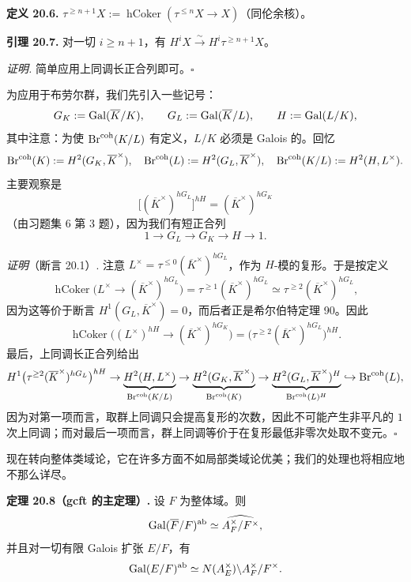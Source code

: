 \textbf{定义 20.6.} $\tau^{\geq n+1}X:=\operatorname{hCoker}(\tau^{\leq n}X\to X)$（同伦余核）。

\textbf{引理 20.7.} 对一切 $i\geq n+1$，有 $H^iX\xrightarrow{\sim}H^i\tau^{\geq n+1}X$。

\textit{证明.} 简单应用上同调长正合列即可。\hfill$\square$

为应用于布劳尔群，我们先引入一些记号：
\[
G_K:=\operatorname{Gal}(\overline K/K),\qquad G_L:=\operatorname{Gal}(\overline K/L),\qquad H:=\operatorname{Gal}(L/K),
\]
其中注意：为使 $\operatorname{Br}^{\mathrm{coh}}(K/L)$ 有定义，$L/K$ 必须是 Galois 的。回忆
\[
\operatorname{Br}^{\mathrm{coh}}(K):=H^2(G_K,\overline K^\times),\quad
\operatorname{Br}^{\mathrm{coh}}(L):=H^2(G_L,\overline K^\times),\quad
\operatorname{Br}^{\mathrm{coh}}(K/L):=H^2(H,L^\times).
\]
主要观察是
\[
\bigl[(\overline K^\times)^{hG_L}\bigr]^{hH}=(\overline K^\times)^{hG_K}
\]
（由习题集 6 第 3 题），因为我们有短正合列
\[
1\to G_L\to G_K\to H\to 1.
\]

\textit{证明}（断言 20.1）. 注意 $L^\times=\tau^{\leq 0}(\overline K^\times)^{hG_L}$，作为 $H$-模的复形。于是按定义
\[
\operatorname{hCoker}\bigl(L^\times\to(\overline K^\times)^{hG_L}\bigr)
=\tau^{\geq 1}(\overline K^\times)^{hG_L}\simeq\tau^{\geq 2}(\overline K^\times)^{hG_L},
\]
因为这等价于断言 $H^1(G_L,\overline K^\times)=0$，而后者正是希尔伯特定理 90。因此
\[
\operatorname{hCoker}\bigl((L^\times)^{hH}\to(\overline K^\times)^{hG_K}\bigr)
=\bigl(\tau^{\geq 2}(\overline K^\times)^{hG_L}\bigr)^{hH}.
\]
最后，上同调长正合列给出
\[
H^1\bigl(\tau^{\geq 2}(\overline K^\times)^{hG_L}\bigr)^{hH}\to
\underbrace{H^2(H,L^\times)}_{\operatorname{Br}^{\mathrm{coh}}(K/L)}\to
\underbrace{H^2(G_K,\overline K^\times)}_{\operatorname{Br}^{\mathrm{coh}}(K)}\to
\underbrace{H^2(G_L,\overline K^\times)^{H}}_{\operatorname{Br}^{\mathrm{coh}}(L)^{H}}\hookrightarrow\operatorname{Br}^{\mathrm{coh}}(L),
\]
因为对第一项而言，取群上同调只会提高复形的次数，因此不可能产生非平凡的 $1$ 次上同调；而对最后一项而言，群上同调等价于在复形最低非零次处取不变元。\hfill$\square$

现在转向整体类域论，它在许多方面不如局部类域论优美；我们的处理也将相应地不那么详尽。

\textbf{定理 20.8（gcft 的主定理）.} 设 $F$ 为整体域。则
\[
\operatorname{Gal}(\overline F/F)^{\mathrm{ab}}\simeq\widehat{A_F^\times/F^\times},
\]
并且对一切有限 Galois 扩张 $E/F$，有
\[
\operatorname{Gal}(E/F)^{\mathrm{ab}}\simeq N(A_E^\times)\backslash A_F^\times/F^\times.
\]

